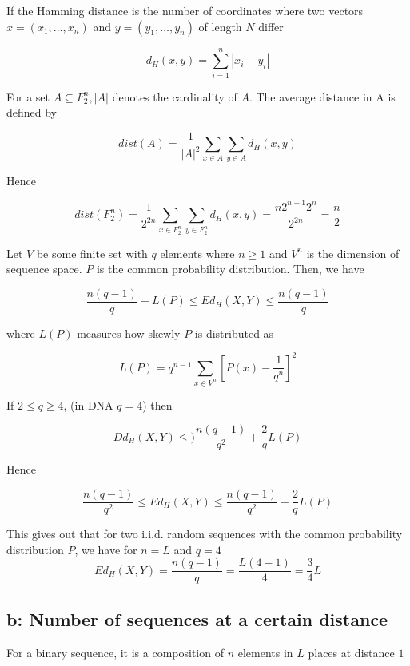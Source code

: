 If the Hamming distance is the number of coordinates where two vectors $x = (x_1,\dots,x_n) $ and $y = (y_1, \dots, y_n)$ of length $N$ differ

\[  d_H(x,y) = \sum\limits_{i=1}^{n} | x_i -y_i |\]

For a set $A \subseteq  F^{n}_{2}, |A|$ denotes the cardinality of $A$. The average distance in A is defined by 

\begin{equation}
dist(A) = \frac{1}{|A|^2}\sum\limits_{x\in A}\sum\limits_{y\in A} d_H(x,y)
\end{equation}

Hence 

\begin{equation}
dist(F^{n}_{2}) = \frac{1}{2^{2n}}\sum\limits_{x\in F^{n}_{2}}\sum\limits_{y\in F^{n}_{2}} d_H(x,y) = \frac{n2^{n-1}2^n}{2^{2n}} = \frac{n}{2}
\end{equation}

Let $V$ be some finite set with $q$ elements where $n \geq 1$ and $V^n$ is the dimension of sequence space.  $P$ is the common probability distribution. Then, we have

\[  \frac{n(q-1)}{q} - L(P) \leq Ed_H(X,Y) \leq \frac{n(q-1)}{q} \]

where $L(P)$ measures how skewly $P$ is distributed as

\[  L(P) = q^{n-1} \sum\limits_{x \in V^n} \left[P(x)-\frac{1}{q^n}\right]^2 \]

If $ 2\leq q \geq 4$, (in DNA $q=4$) then 

\[  Dd_H(X,Y) \leq )\frac{n(q-1)}{q^2} + \frac{2}{q}L(P) \]

Hence

\[  \frac{n(q-1)}{q^2}  \leq Ed_H(X,Y) \leq \frac{n(q-1)}{q^2} + \frac{2}{q}L(P) \]

This gives out that for two i.i.d. random sequences with the common probability distribution $P$, we have for  $n = L$ and $q = 4$
\begin{equation}
Ed_H(X,Y)  = \frac{n(q-1)}{q} = \frac{L(4-1)}{4} = \frac{3}{4}L
\end{equation}


\subsection{b: Number of sequences at a certain distance}

For a binary sequence, it is a composition of $n$ elements in $L$ places at distance $1$

